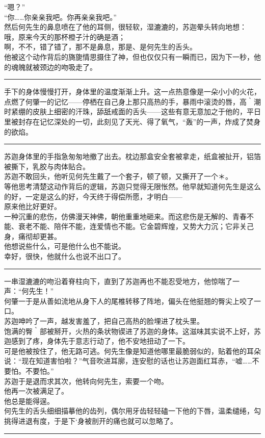 \documentclass[oneside,11pt]{memoir} %
\begin{document}
\begin{CJK}{UTF8}{gbsn}
     “嗯？”\\\indent
     “你……你亲亲我吧。你再亲亲我吧。”\\\indent
     然后何先生的鼻息喷在了他的耳侧，很轻软，湿漉漉的，苏迦晕头转向地想：\\\indent
     哦，原来今天的那杯橙子汁的确是酒；\\\indent
     啊，不不，错了错了，那不是鼻息，那是、是何先生的舌头。\\\indent
     他被这个动作背后的旖旎情思摄住了神，但也仅仅只有一瞬而已，因为下一秒，他的魂魄就被颈边的吻吸走了。\\\indent
\rule{-3pt}{30pt}
     手下的身体慢慢打开，身体里的温度渐渐上升。这一点热意像是一朵小小的火花，点燃了何肇一的记忆——停栖在自己身上那只高热的手，暴雨中滚烫的唇，高｀潮时紧绷的皮肤上细密的汗珠，舔舐戒面的舌头——这些有意无意加之于他的，平日里被封存在记忆深处的一切，此刻见了天光、得了氧气，“轰”的一声，炸成了焚身的欲焰。\\\indent
\rule{-3pt}{30pt}
     苏迦身体里的手指急匆匆地撤了出去。枕边那盒安全套被拿走，纸盒被扯开，铝箔被撕下，乳胶与肉体贴合。\\\indent
    苏迦不敢回头，他听见何先生戴了一个套子，顿了顿，又撕开了一个＊。\\\indent
    等他思考清楚这动作背后的逻辑，苏迦只觉得无限怅然。他早就知道何先生是这么的好，一定是这么的好，今天终于得偿所愿，才明白——\\\indent
    原来他比好更好。\\\indent
    一种沉重的悲伤，仿佛漫天神佛，朝他重重地砸来。而这悲伤是无解的、青春不能、衰老不能、陪伴不能，连爱情也不能。它金碧辉煌，又势大力沉；它非关己身，痛彻却更甚。\\\indent
    他想说些什么，可是他什么也不能说。\\\indent
    幸好，很快，他就什么也说不出口了。\\\indent
     \rule{-3pt}{30pt}
    一串湿漉漉的吻沿着脊柱向下，直到了苏迦再也不能忍受地方，他惊喘了一声：“何先生！”\\\indent
    何肇一于是从善如流地从身下人的尾椎转移了阵地，偏头在他挺翘的臀尖上咬了一口。\\\indent
    苏迦呻吟了一声，越发害羞了，把自己高热的脸埋进了枕头里。\\\indent
    饱满的臀｀部被掰开，火热的条状物锲进了苏迦的身体。这滋味其实说不上好，苏迦感到了疼，身体先于意志行动了，他不安地扭动了一下。\\\indent
    可是他被按住了，他无路可逃。何先生像是知道他哪里最脆弱似的，贴着他的耳朵说：“现在知道害怕啦？”气音吹进耳廓，连安慰的话也让苏迦面红耳赤，“嘘……不要怕。不要怕。”\\\indent
    苏迦于是退而求其次，他转向何先生，索要一个吻。\\\indent
    他再一次被满足了。\\\indent
    他总是能得逞。\\\indent
    何先生的舌头细细描摹他的齿列，偶尔用牙齿轻轻磕一下他的下唇，温柔缱绻，勾挑得进退有度，于是下`身被剖开的痛也就可以忽略了。\\\indent
\rule{-3pt}{30pt}


\end{CJK}
\end{document}
